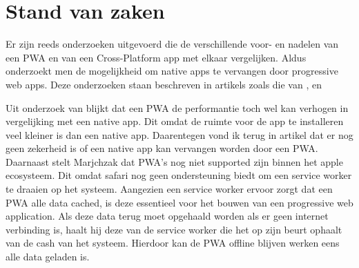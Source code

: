 
\section{Stand van zaken}
\label{sec:stand van zaken}
Er zijn reeds onderzoeken uitgevoerd die de verschillende
voor- en nadelen van een PWA en van een Cross-Platform app met elkaar vergelijken. Aldus onderzoekt men de mogelijkheid om native apps te vervangen door progressive web apps.
Deze onderzoeken staan beschreven in artikels zoals die van \cite{PWA_vs_Cross-Platform}, \cite{Tinder_PWA} en \cite{Webview_PWA}

Uit onderzoek van \cite{Tinder_PWA} blijkt dat een PWA de performantie toch wel kan verhogen in vergelijking met een native app. Dit omdat de ruimte voor de app te installeren veel kleiner is dan een native app. Daarentegen vond ik terug in artikel \cite{PWA_vs_Cross-Platform} dat er nog geen zekerheid is of een native app kan vervangen worden door een PWA.
Daarnaast stelt Marjchzak dat PWA’s nog niet supported zijn binnen het apple ecosysteem. Dit omdat safari nog geen ondersteuning biedt om een service worker te draaien op het systeem. Aangezien een service worker ervoor zorgt dat een PWA alle data cached, is deze essentieel voor het bouwen van een progressive web application. Als deze data terug moet opgehaald worden als er geen internet verbinding is, haalt hij deze van de service worker die het op zijn beurt ophaalt van de cash van het systeem. Hierdoor kan de PWA offline blijven werken eens alle data geladen is.






